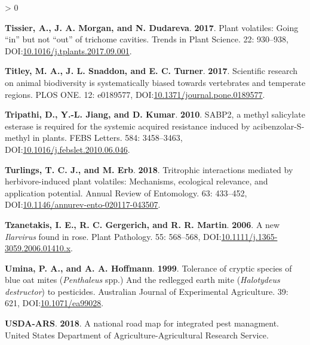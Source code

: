 \documentclass{ufdissertation}[overrideChapters] %
\newlength{\cslhangindent}
\newenvironment{CSLReferences}[2] %
 {%
  \setlength{\parindent}{0pt}
  \ifodd #1 \everypar{\setlength{\hangindent}{\cslhangindent}}\ignorespaces\fi
  \ifnum #2 > 0
  \setlength{\parskip}{#2\baselineskip}
  \fi
 }%
 {}
\begin{document}
{\begin{CSLReferences}{1}{1}
\leavevmode{}%
\textbf{Tissier, A., J. A. Morgan, and N. Dudareva}. \textbf{2017}. Plant volatiles: Going {``in''} but not {``out''} of trichome cavities. Trends in Plant Science. 22: 930--938, DOI:\href{https://doi.org/10.1016/j.tplants.2017.09.001}{10.1016/j.tplants.2017.09.001}.

\leavevmode{}%
\textbf{Titley, M. A., J. L. Snaddon, and E. C. Turner}. \textbf{2017}. Scientific research on animal biodiversity is systematically biased towards vertebrates and temperate regions. {PLOS} {ONE}. 12: e0189577, DOI:\href{https://doi.org/10.1371/journal.pone.0189577}{10.1371/journal.pone.0189577}.

\leavevmode{}%
\textbf{Tripathi, D., Y.-L. Jiang, and D. Kumar}. \textbf{2010}. {SABP}2, a methyl salicylate esterase is required for the systemic acquired resistance induced by acibenzolar-{S}-methyl in plants. {FEBS} Letters. 584: 3458--3463, DOI:\href{https://doi.org/10.1016/j.febslet.2010.06.046}{10.1016/j.febslet.2010.06.046}.

\leavevmode{}%
\textbf{Turlings, T. C. J., and M. Erb}. \textbf{2018}. Tritrophic interactions mediated by herbivore-induced plant volatiles: Mechanisms, ecological relevance, and application potential. Annual Review of Entomology. 63: 433--452, DOI:\href{https://doi.org/10.1146/annurev-ento-020117-043507}{10.1146/annurev-ento-020117-043507}.

\leavevmode{}%
\textbf{Tzanetakis, I. E., R. C. Gergerich, and R. R. Martin}. \textbf{2006}. A new {\emph{Ilarvirus}} found in rose. Plant Pathology. 55: 568--568, DOI:\href{https://doi.org/10.1111/j.1365-3059.2006.01410.x}{10.1111/j.1365-3059.2006.01410.x}.

\leavevmode{}%
\textbf{Umina, P. A., and A. A. Hoffmann}. \textbf{1999}. Tolerance of cryptic species of blue oat mites ({\emph{Penthaleus}} spp.) And the redlegged earth mite ({\emph{Halotydeus destructor}}) to pesticides. Australian Journal of Experimental Agriculture. 39: 621, DOI:\href{https://doi.org/10.1071/ea99028}{10.1071/ea99028}.

\leavevmode{}%
\textbf{USDA-ARS}. \textbf{2018}. A national road map for integrated pest managment. {United States} Department of Agriculture-Agricultural Research Service.


\end{CSLReferences}}
\end{document}
